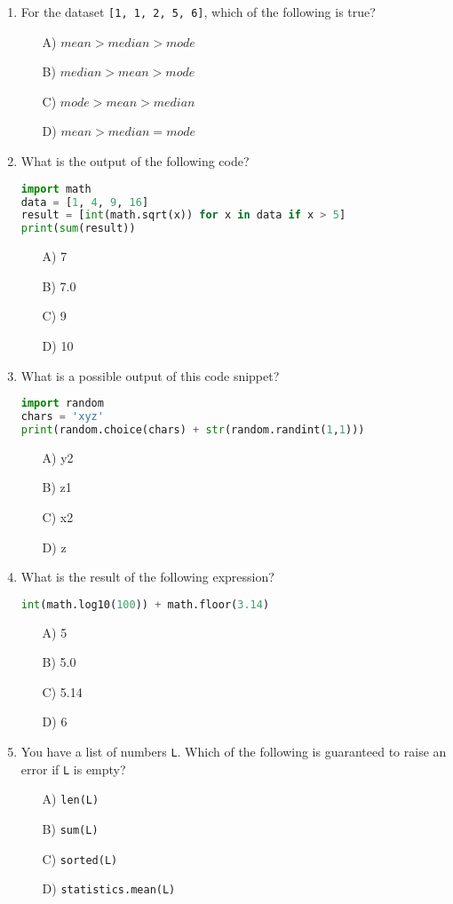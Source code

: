\documentclass[9pt]{article}
\begin{document}
\begin{multicols}{2}
\begin{enumerate}
\item For the dataset \texttt{[1, 1, 2, 5, 6]}, which of the following is true?
\begin{enumerate}
    \item[A)] $mean > median > mode$
    \item[B)] $median > mean > mode$
    \item[C)] $mode > mean > median$
    \item[D)] $mean > median = mode$
\end{enumerate}

\item What is the output of the following code?
\begin{lstlisting}[language=Python]
import math
data = [1, 4, 9, 16]
result = [int(math.sqrt(x)) for x in data if x > 5]
print(sum(result))
\end{lstlisting}
\begin{enumerate}
\item[A)] 7
\item[B)] 7.0
\item[C)] 9
\item[D)] 10
\end{enumerate}

\item What is a possible output of this code snippet?
\begin{lstlisting}[language=Python]
import random
chars = 'xyz'
print(random.choice(chars) + str(random.randint(1,1)))
\end{lstlisting}
\begin{enumerate}
\item[A)] y2
\item[B)] z1
\item[C)] x2
\item[D)] z
\end{enumerate}

\item What is the result of the following expression?
\begin{lstlisting}[language=Python]
int(math.log10(100)) + math.floor(3.14)
\end{lstlisting}
\begin{enumerate}
\item[A)] 5
\item[B)] 5.0
\item[C)] 5.14
\item[D)] 6
\end{enumerate}

\item You have a list of numbers \texttt{L}. Which of the following is guaranteed to raise an error if \texttt{L} is empty?
\begin{enumerate}
    \item[A)] \texttt{len(L)}
    \item[B)] \texttt{sum(L)}
    \item[C)] \texttt{sorted(L)}
    \item[D)] \texttt{statistics.mean(L)}
\end{enumerate}


\end{enumerate}
\end{multicols}
\end{document}
